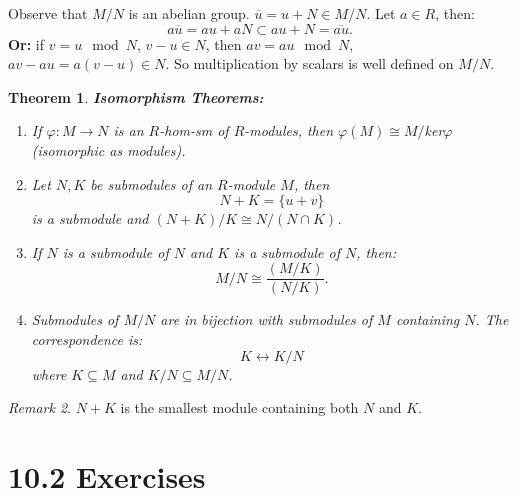 \documentclass[9pt,reqno,twoside]{amsbook}
\theoremstyle{plain}
\newtheorem{theorem}{Theorem}[chapter]
\numberwithin{section}{chapter}
\numberwithin{equation}{chapter}
\theoremstyle{definition}
\theoremstyle{remark}
\newtheorem{rem}[theorem]{Remark}
\theoremstyle{plain}
\newcommand{\sub}{\subseteq}
\renewcommand{\phi}{\varphi}
\begin{document}
Observe that $M/N$ is an abelian group. $\overline{u} = u + N \in M/N$. Let $a \in R$, then: 
$$
a\overline{u} = au + aN \subset au + N = \overline{au}.
$$
\textbf{Or:} if $v = u \mod N$, $v - u \in N$, then $av = au \mod N$, $av - au = a(v - u) \in N$. So multiplication by scalars is well defined on $M/N$. 


\begin{theorem}
\textbf{Isomorphism Theorems:}
\begin{enumerate}
\item If $\phi:M \to N$ is an $R$-hom-sm of $R$-modules, then $\phi(M) \cong M/$ker$\phi$ (isomorphic as modules). 
\item Let $N,K$ be submodules of an $R$-module $M$, then 
$$
N + K = \{u + v\}
$$
is a submodule and $(N + K)/K \cong N/(N \cap K)$. 
\item If $N$ is a submodule of $N$ and $K$ is a submodule of $N$, then: 
$$
M/N \cong \frac{(M/K)}{(N/K)}.
$$
\item Submodules of $M/N$ are in bijection with submodules of $M$ containing $N$. The correspondence is:
$$
K \leftrightarrow K/N
$$
where $K \sub M$ and $K/N \sub M/N$. 
\end{enumerate}
\end{theorem}

\begin{rem}
$N + K$ is the smallest module containing both $N$ and $K$. 
\end{rem}

\section*{10.2 Exercises}
\end{document}
